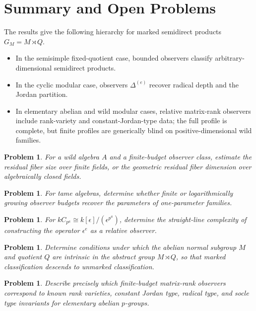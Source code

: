 \documentclass[11pt]{article}
\newtheorem{problem}[theorem]{Problem}
\begin{document}
\section{Summary and Open Problems}

The results give the following hierarchy for marked semidirect products $G_M=M\rtimes Q$.

\begin{itemize}
\item In the semisimple fixed-quotient case, bounded observers classify arbitrary-dimensional semidirect products.
\item In the cyclic modular case, observers $\Delta^{(e)}$ recover radical depth and the Jordan partition.
\item In elementary abelian and wild modular cases, relative matrix-rank observers include rank-variety and constant-Jordan-type data; the full profile is complete, but finite profiles are generically blind on positive-dimensional wild families.
\end{itemize}

\begin{problem}
For a wild algebra $A$ and a finite-budget observer class, estimate the residual fiber size over finite fields, or the geometric residual fiber dimension over algebraically closed fields.
\end{problem}

\begin{problem}
For tame algebras, determine whether finite or logarithmically growing observer budgets recover the parameters of one-parameter families.
\end{problem}

\begin{problem}
For $kC_{p^a}\cong k[\epsilon]/(\epsilon^{p^a})$, determine the straight-line complexity of constructing the operator $\epsilon^e$ as a relative observer.
\end{problem}

\begin{problem}
Determine conditions under which the abelian normal subgroup $M$ and quotient $Q$ are intrinsic in the abstract group $M\rtimes Q$, so that marked classification descends to unmarked classification.
\end{problem}

\begin{problem}
Describe precisely which finite-budget matrix-rank observers correspond to known rank varieties, constant Jordan type, radical type, and socle type invariants for elementary abelian $p$-groups.
\end{problem}
\end{document}
